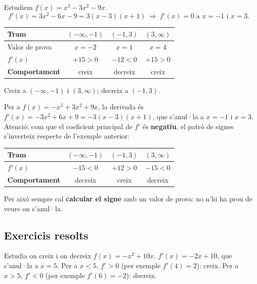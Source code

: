 \begin{exemple}
Estudiem $f(x)=x^3-3x^2-9x$.
\[
f'(x)=3x^2-6x-9=3(x-3)(x+1)\ \Rightarrow\ f'(x)=0 \text{ a } x=-1 \text{ i } x=3.
\]
\begin{center}
\renewcommand{\arraystretch}{1.3}
\begin{tabular}{l c c c}
\toprule
\textbf{Tram} & $(-\infty,-1)$ & $(-1,3)$ & $(3,\infty)$ \\
\midrule
Valor de prova & $x=-2$ & $x=1$ & $x=4$ \\
$f'(x)$ & $+15>0$ & $-12<0$ & $+15>0$ \\
\textbf{Comportament} & creix & decreix & creix \\
\bottomrule
\end{tabular}
\end{center}
Creix a $(-\infty,-1)$ i $(3,\infty)$; decreix a $(-1,3)$.
\end{exemple}

\begin{exemple}
Per a $f(x)=-x^3+3x^2+9x$, la derivada és $f'(x)=-3x^2+6x+9=-3(x-3)(x+1)$, que
s'anul·la a $x=-1$ i $x=3$. Atenció: com que el coeficient principal de $f'$ és
\textbf{negatiu}, el patró de signes s'inverteix respecte de l'exemple anterior:
\begin{center}
\renewcommand{\arraystretch}{1.3}
\begin{tabular}{l c c c}
\toprule
\textbf{Tram} & $(-\infty,-1)$ & $(-1,3)$ & $(3,\infty)$ \\
\midrule
$f'(x)$ & $-15<0$ & $+12>0$ & $-15<0$ \\
\textbf{Comportament} & decreix & creix & decreix \\
\bottomrule
\end{tabular}
\end{center}
Per això sempre cal \textbf{calcular el signe} amb un valor de prova: no n'hi ha prou de
veure on s'anul·la.
\end{exemple}

\subsection{Exercicis resolts}

\begin{exresolt}
Estudia on creix i on decreix $f(x)=-x^2+10x$.
\solucio
$f'(x)=-2x+10$, que s'anul·la a $x=5$. Per a $x<5$, $f'>0$ (per exemple $f'(4)=2$):
creix. Per a $x>5$, $f'<0$ (per exemple $f'(6)=-2$): decreix.
\end{exresolt}

